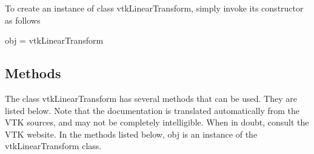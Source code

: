 To create an instance of class vtk\-Linear\-Transform, simply invoke its constructor as follows \begin{DoxyVerb}  obj = vtkLinearTransform
\end{DoxyVerb}
 \hypertarget{vtkwidgets_vtkxyplotwidget_Methods}{}\subsection{Methods}\label{vtkwidgets_vtkxyplotwidget_Methods}
The class vtk\-Linear\-Transform has several methods that can be used. They are listed below. Note that the documentation is translated automatically from the V\-T\-K sources, and may not be completely intelligible. When in doubt, consult the V\-T\-K website. In the methods listed below, {\ttfamily obj} is an instance of the vtk\-Linear\-Transform class. 
